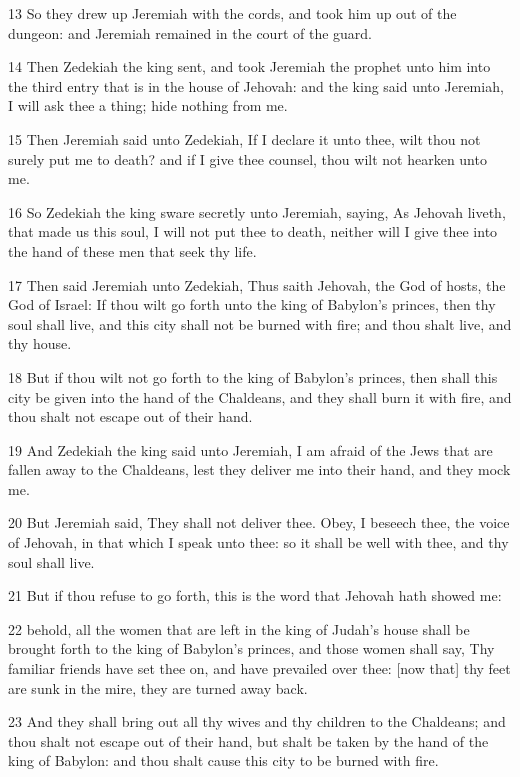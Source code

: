 \par 13 So they drew up Jeremiah with the cords, and took him up out of the dungeon: and Jeremiah remained in the court of the guard.
\par 14 Then Zedekiah the king sent, and took Jeremiah the prophet unto him into the third entry that is in the house of Jehovah: and the king said unto Jeremiah, I will ask thee a thing; hide nothing from me.
\par 15 Then Jeremiah said unto Zedekiah, If I declare it unto thee, wilt thou not surely put me to death? and if I give thee counsel, thou wilt not hearken unto me.
\par 16 So Zedekiah the king sware secretly unto Jeremiah, saying, As Jehovah liveth, that made us this soul, I will not put thee to death, neither will I give thee into the hand of these men that seek thy life.
\par 17 Then said Jeremiah unto Zedekiah, Thus saith Jehovah, the God of hosts, the God of Israel: If thou wilt go forth unto the king of Babylon's princes, then thy soul shall live, and this city shall not be burned with fire; and thou shalt live, and thy house.
\par 18 But if thou wilt not go forth to the king of Babylon's princes, then shall this city be given into the hand of the Chaldeans, and they shall burn it with fire, and thou shalt not escape out of their hand.
\par 19 And Zedekiah the king said unto Jeremiah, I am afraid of the Jews that are fallen away to the Chaldeans, lest they deliver me into their hand, and they mock me.
\par 20 But Jeremiah said, They shall not deliver thee. Obey, I beseech thee, the voice of Jehovah, in that which I speak unto thee: so it shall be well with thee, and thy soul shall live.
\par 21 But if thou refuse to go forth, this is the word that Jehovah hath showed me:
\par 22 behold, all the women that are left in the king of Judah's house shall be brought forth to the king of Babylon's princes, and those women shall say, Thy familiar friends have set thee on, and have prevailed over thee: [now that] thy feet are sunk in the mire, they are turned away back.
\par 23 And they shall bring out all thy wives and thy children to the Chaldeans; and thou shalt not escape out of their hand, but shalt be taken by the hand of the king of Babylon: and thou shalt cause this city to be burned with fire.
